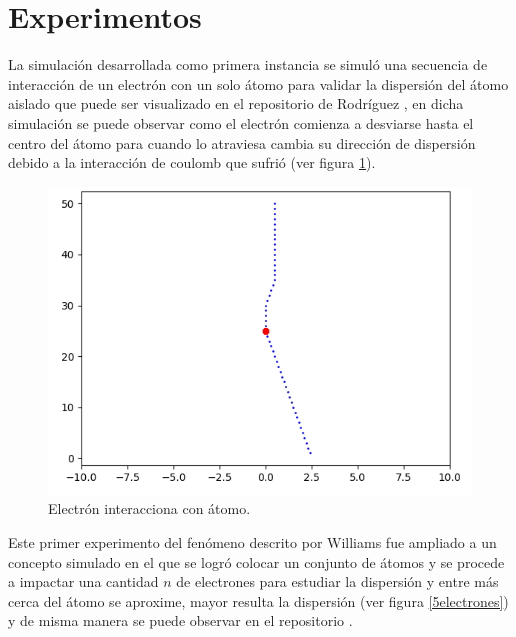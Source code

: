 \documentclass[3pt,twocolumn]{elsarticle}
\begin{document}
\section{Experimentos}
La simulación desarrollada como primera instancia se simuló una secuencia de interacción de un electrón con un solo átomo para validar la dispersión del átomo aislado que puede ser visualizado en el repositorio de Rodríguez \cite{nestor}, en dicha simulación se puede observar como el electrón comienza a desviarse hasta el centro del átomo para cuando lo atraviesa cambia su dirección de dispersión debido a la interacción de coulomb que sufrió (ver figura \ref{atm_aislado}).
\begin{figure}[h!]
    \centering
    \includegraphics[scale=.4]{atm_elec.png}
    \caption{Electrón interacciona con átomo.}
    \label{atm_aislado}
\end{figure}
Este primer experimento del fenómeno descrito por Williams \cite{tem} fue ampliado a un concepto simulado en el que se logró colocar un conjunto de átomos y se procede a impactar una cantidad $n$ de electrones para estudiar la dispersión y entre más cerca del átomo se aproxime, mayor resulta la dispersión (ver figura \ref{5electrones}) y de misma manera se puede observar en el repositorio \cite{nestor}. 
\end{document}
